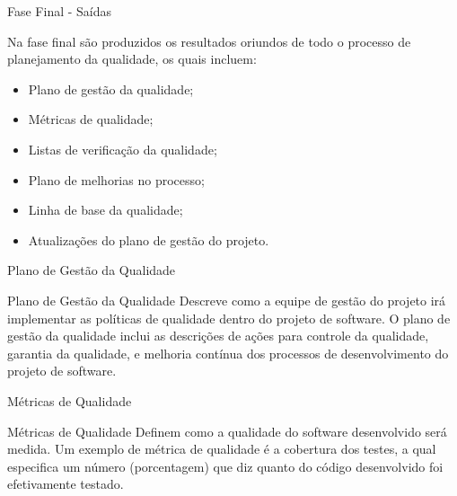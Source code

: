 \documentclass[xcolor=x11names,compress]{beamer}
\begin{document}
\begin{frame}{Fase Final - Saídas}

Na fase final são produzidos os resultados oriundos de todo o processo de planejamento da qualidade, os quais incluem:

\begin{itemize}
\itemsep 5mm

\item Plano de gestão da qualidade;

\item Métricas de qualidade;

\item Listas de verificação da qualidade;

\item Plano de melhorias no processo;

\item Linha de base da qualidade;

\item Atualizações do plano de gestão do projeto.

\end{itemize}

\end{frame}

\begin{frame}{Plano de Gestão da Qualidade}

\begin{alertblock}{Plano de Gestão da Qualidade}
Descreve como a equipe de gestão do projeto irá implementar as políticas de qualidade dentro do projeto de software. O plano de gestão da qualidade inclui as descrições de ações para controle da qualidade, garantia da qualidade, e melhoria contínua dos processos de desenvolvimento do projeto de software.
\end{alertblock}

\end{frame}

\begin{frame}{Métricas de Qualidade}

\begin{alertblock}{Métricas de Qualidade}
Definem como a qualidade do software desenvolvido será medida. Um exemplo de métrica de qualidade é a cobertura dos testes, a qual especifica um número (porcentagem) que diz quanto do código desenvolvido foi efetivamente testado.
\end{alertblock}

\end{frame}
\end{document}
